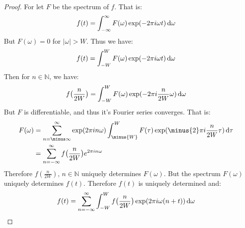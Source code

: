     \begin{proof}
        For let $F$ be the spectrum of $f$. That is:
        \begin{equation}
            f(t)=\int_{-\infty}^{\infty}F(\omega)
            \exp(-2\pi{i}\omega{t})\mathop{}\!\mathrm{d}{\omega}
        \end{equation}
        But $F(\omega)=0$ for $|\omega|>W$. Thus we have:
        \begin{equation}
            f(t)=\int_{-W}^{W}F(\omega)
            \exp(-2\pi{i}\omega{t})\mathop{}\!\mathrm{d}{\omega}
        \end{equation}
        Then for $n\in\mathbb{N}$, we have:
        \begin{equation}
            f\big(\frac{n}{2W}\big)=\int_{-W}^{W}F(\omega)
            \exp(-2\pi{i}\frac{n}{2W}\omega)\mathop{}\!\mathrm{d}{\omega}
        \end{equation}
        But $F$ is differentiable, and thus it's Fourier
        series converges. That is:
        \begin{subequations}
            \begin{align}
                F(\omega)
                &=\sum_{n=\minus\infty}^{\infty}
                    \exp(2\pi{i}n\omega)
                \int_{\minus{W}}^{W}F(\tau)
                \exp(\minus{2}\pi{i}\frac{n}{2W}\tau)
                    \diff{\tau}\\
                &=\sum_{n=-\infty}^{\infty}f
                  \big(\frac{n}{2W}\big)e^{2\pi{i}n\omega}
            \end{align}
        \end{subequations}
        Therefore $f(\frac{n}{2W})$, $n\in \mathbb{N}$
        uniquely determines $F(\omega)$. But the
        spectrum $F(\omega)$ uniquely determines
        $f(t)$. Therefore $f(t)$ is
        uniquely determined and:
        \begin{equation}
            f(t)=\sum_{n=-\infty}^{\infty}\int_{-W}^{W}
            f\big(\frac{n}{2W}\big)
            \exp(2\pi{i}\omega(n+t))\mathop{}\!\mathrm{d}{\omega}
        \end{equation}
    \end{proof}
